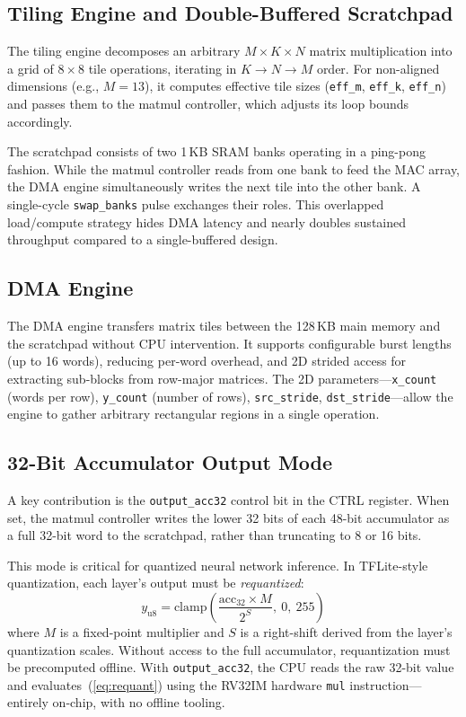 \documentclass[conference]{IEEEtran}
\begin{document}
\subsection{Tiling Engine and Double-Buffered Scratchpad}

The tiling engine decomposes an arbitrary $M\times K \times N$ matrix multiplication into a grid of $8\times8$ tile operations, iterating in $K \rightarrow N \rightarrow M$ order. For non-aligned dimensions (e.g., $M=13$), it computes effective tile sizes (\texttt{eff\_m}, \texttt{eff\_k}, \texttt{eff\_n}) and passes them to the matmul controller, which adjusts its loop bounds accordingly.

The scratchpad consists of two 1\,KB SRAM banks operating in a ping-pong fashion. While the matmul controller reads from one bank to feed the MAC array, the DMA engine simultaneously writes the next tile into the other bank. A single-cycle \texttt{swap\_banks} pulse exchanges their roles. This overlapped load/compute strategy hides DMA latency and nearly doubles sustained throughput compared to a single-buffered design.

\subsection{DMA Engine}

The DMA engine transfers matrix tiles between the 128\,KB main memory and the scratchpad without CPU intervention. It supports configurable burst lengths (up to 16 words), reducing per-word overhead, and 2D strided access for extracting sub-blocks from row-major matrices. The 2D parameters---\texttt{x\_count} (words per row), \texttt{y\_count} (number of rows), \texttt{src\_stride}, \texttt{dst\_stride}---allow the engine to gather arbitrary rectangular regions in a single operation.

\subsection{32-Bit Accumulator Output Mode}

A key contribution is the \texttt{output\_acc32} control bit in the CTRL register. When set, the matmul controller writes the lower 32 bits of each 48-bit accumulator as a full 32-bit word to the scratchpad, rather than truncating to 8 or 16 bits.

This mode is critical for quantized neural network inference. In TFLite-style quantization, each layer's output must be \emph{requantized}:
\begin{equation}
    y_{\text{u8}} = \text{clamp}\!\left(\frac{\text{acc}_{32} \times M}{2^{S}},\ 0,\ 255\right)
    \label{eq:requant}
\end{equation}
where $M$ is a fixed-point multiplier and $S$ is a right-shift derived from the layer's quantization scales. Without access to the full accumulator, requantization must be precomputed offline. With \texttt{output\_acc32}, the CPU reads the raw 32-bit value and evaluates~(\ref{eq:requant}) using the RV32IM hardware \texttt{mul} instruction---entirely on-chip, with no offline tooling.
\end{document}
